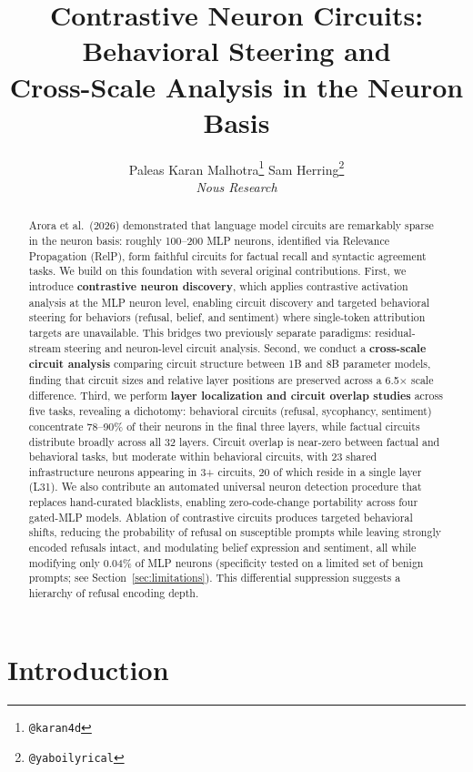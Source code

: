 \documentclass[11pt]{article}
\title{Contrastive Neuron Circuits: Behavioral Steering and \\ Cross-Scale Analysis in the Neuron Basis}
\author{%
  Paleas
  \quad
  Karan Malhotra\thanks{\texttt{@karan4d}}
  \quad
  Sam Herring\thanks{\texttt{@yaboilyrical}} \\[6pt]
  \textit{Nous Research}
}
\begin{document}
\maketitle

\begin{abstract}
Arora et al.\ (2026) demonstrated that language model circuits are remarkably sparse in the neuron basis: roughly 100--200 MLP neurons, identified via Relevance Propagation (RelP), form faithful circuits for factual recall and syntactic agreement tasks.
We build on this foundation with several original contributions.
First, we introduce \textbf{contrastive neuron discovery}, which applies contrastive activation analysis at the MLP neuron level, enabling circuit discovery and targeted behavioral steering for behaviors (refusal, belief, and sentiment) where single-token attribution targets are unavailable.
This bridges two previously separate paradigms: residual-stream steering and neuron-level circuit analysis.
Second, we conduct a \textbf{cross-scale circuit analysis} comparing circuit structure between 1B and 8B parameter models, finding that circuit sizes and relative layer positions are preserved across a 6.5$\times$ scale difference.
Third, we perform \textbf{layer localization and circuit overlap studies} across five tasks, revealing a dichotomy: behavioral circuits (refusal, sycophancy, sentiment) concentrate 78--90\% of their neurons in the final three layers, while factual circuits distribute broadly across all 32 layers.
Circuit overlap is near-zero between factual and behavioral tasks, but moderate within behavioral circuits, with 23 shared infrastructure neurons appearing in 3+ circuits, 20 of which reside in a single layer (L31).
We also contribute an automated universal neuron detection procedure that replaces hand-curated blacklists, enabling zero-code-change portability across four gated-MLP models.
Ablation of contrastive circuits produces targeted behavioral shifts, reducing the probability of refusal on susceptible prompts while leaving strongly encoded refusals intact, and modulating belief expression and sentiment, all while modifying only 0.04\% of MLP neurons (specificity tested on a limited set of benign prompts; see Section~\ref{sec:limitations}).
This differential suppression suggests a hierarchy of refusal encoding depth.
\end{abstract}


\section{Introduction}
\label{sec:intro}
\end{document}
